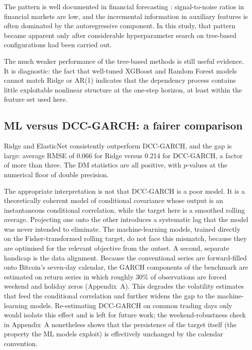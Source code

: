 The pattern is well documented in financial forecasting \cite{welch2008}: signal-to-noise ratios in financial markets are low, and the incremental information in auxiliary features is often dominated by the autoregressive component. In this study, that pattern became apparent only after considerable hyperparameter search on tree-based configurations had been carried out.

The much weaker performance of the tree-based methods is still useful evidence. It is diagnostic: the fact that well-tuned XGBoost and Random Forest models cannot match Ridge or AR(1) indicates that the dependency process contains little exploitable nonlinear structure at the one-step horizon, at least within the feature set used here.

\subsection{ML versus DCC-GARCH: a fairer comparison}

Ridge and ElasticNet consistently outperform DCC-GARCH, and the gap is large: average RMSE of 0.066 for Ridge versus 0.214 for DCC-GARCH, a factor of more than three. The DM statistics are all positive, with $p$-values at the numerical floor of double precision.

The appropriate interpretation is not that DCC-GARCH is a poor model. It is a theoretically coherent model of conditional covariance whose output is an instantaneous conditional correlation, while the target here is a smoothed rolling average. Projecting one onto the other introduces a systematic lag that the model was never intended to eliminate. The machine-learning models, trained directly on the Fisher-transformed rolling target, do not face this mismatch, because they are optimised for the relevant objective from the outset. A second, separate handicap is the data alignment. Because the conventional series are forward-filled onto Bitcoin's seven-day calendar, the GARCH components of the benchmark are estimated on return series in which roughly 30\% of observations are forced weekend and holiday zeros (Appendix~A). This degrades the volatility estimates that feed the conditional correlation and further widens the gap to the machine-learning models. Re-estimating DCC-GARCH on common trading days only would isolate this effect and is left for future work; the weekend-robustness check in Appendix~A nonetheless shows that the persistence of the target itself (the property the ML models exploit) is effectively unchanged by the calendar convention.

